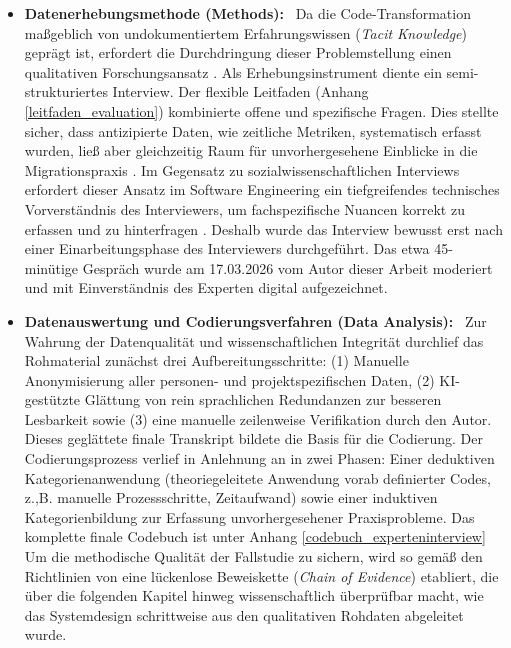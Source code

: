 \begin{itemize}
\item \textbf{Datenerhebungsmethode (Methods):} \
Da die Code-Transformation maßgeblich von undokumentiertem Erfahrungswissen (\textit{Tacit Knowledge}) geprägt ist, erfordert die Durchdringung dieser Problemstellung einen qualitativen Forschungsansatz \parencite{seamanQualitativeMethodsEmpirical1999}. Als Erhebungsinstrument diente ein semi-strukturiertes Interview. Der flexible Leitfaden (Anhang \ref{leitfaden_evaluation}) kombinierte offene und spezifische Fragen. Dies stellte sicher, dass antizipierte Daten, wie zeitliche Metriken, systematisch erfasst wurden, ließ aber gleichzeitig Raum für unvorhergesehene Einblicke in die Migrationspraxis \parencite{seamanQualitativeMethodsEmpirical1999}. Im Gegensatz zu sozialwissenschaftlichen Interviews erfordert dieser Ansatz im Software Engineering ein tiefgreifendes technisches Vorverständnis des Interviewers, um fachspezifische Nuancen korrekt zu erfassen und zu hinterfragen \parencite{hoveExperiencesConductingSemistructured2005}. Deshalb wurde das Interview bewusst erst nach einer Einarbeitungsphase des Interviewers durchgeführt. Das etwa 45-minütige Gespräch wurde am 17.03.2026 vom Autor dieser Arbeit moderiert und mit Einverständnis des Experten digital aufgezeichnet.


\item \textbf{Datenauswertung und Codierungsverfahren (Data Analysis):} \
Zur Wahrung der Datenqualität und wissenschaftlichen Integrität durchlief das Rohmaterial zunächst drei Aufbereitungsschritte: (1) Manuelle Anonymisierung aller personen- und projektspezifischen Daten, (2) \ac{KI}-gestützte Glättung von rein sprachlichen Redundanzen zur besseren Lesbarkeit sowie (3) eine manuelle zeilenweise Verifikation durch den Autor. Dieses geglättete finale Transkript bildete die Basis für die Codierung. Der Codierungsprozess verlief in Anlehnung an \textcite{mayringQualitativeContentAnalysis2014} in zwei Phasen: Einer deduktiven Kategorienanwendung (theoriegeleitete Anwendung vorab definierter Codes, z.,B. manuelle Prozessschritte, Zeitaufwand) sowie einer induktiven Kategorienbildung zur Erfassung unvorhergesehener Praxisprobleme. Das komplette finale Codebuch ist unter Anhang \ref{codebuch_experteninterview}  Um die methodische Qualität der Fallstudie zu sichern, wird so gemäß den Richtlinien von \textcite{runesonGuidelinesConductingReporting2009} eine lückenlose Beweiskette (\textit{Chain of Evidence}) etabliert, die über die folgenden Kapitel hinweg wissenschaftlich überprüfbar macht, wie das Systemdesign schrittweise aus den qualitativen Rohdaten abgeleitet wurde.
\end{itemize}
